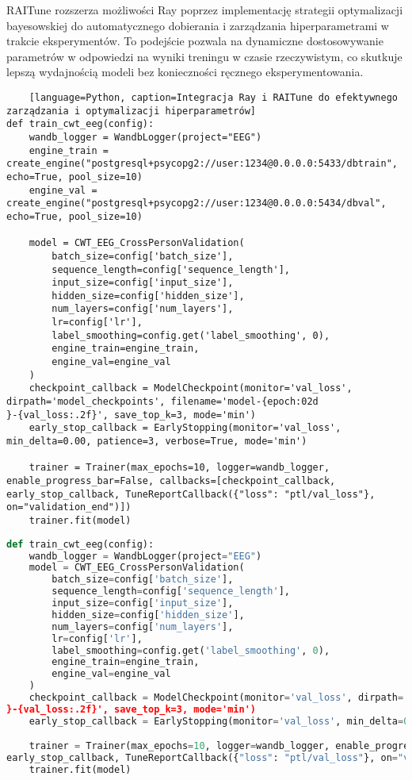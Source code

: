 \documentclass[12pt,twoside]{article}
\begin{document}
    RAITune rozszerza możliwości Ray poprzez implementację strategii optymalizacji bayesowskiej do automatycznego
    dobierania i zarządzania hiperparametrami w trakcie eksperymentów. To podejście pozwala na dynamiczne dostosowywanie
    parametrów w odpowiedzi na wyniki treningu w czasie rzeczywistym, co skutkuje lepszą wydajnością modeli bez
    konieczności ręcznego eksperymentowania.

    \begin{lstlisting}
    [language=Python, caption=Integracja Ray i RAITune do efektywnego zarządzania i optymalizacji hiperparametrów]
def train_cwt_eeg(config):
    wandb_logger = WandbLogger(project="EEG")
    engine_train = create_engine("postgresql+psycopg2://user:1234@0.0.0.0:5433/dbtrain", echo=True, pool_size=10)
    engine_val = create_engine("postgresql+psycopg2://user:1234@0.0.0.0:5434/dbval", echo=True, pool_size=10)

    model = CWT_EEG_CrossPersonValidation(
        batch_size=config['batch_size'],
        sequence_length=config['sequence_length'],
        input_size=config['input_size'],
        hidden_size=config['hidden_size'],
        num_layers=config['num_layers'],
        lr=config['lr'],
        label_smoothing=config.get('label_smoothing', 0),
        engine_train=engine_train,
        engine_val=engine_val
    )
    checkpoint_callback = ModelCheckpoint(monitor='val_loss', dirpath='model_checkpoints', filename='model-{epoch:02d
}-{val_loss:.2f}', save_top_k=3, mode='min')
    early_stop_callback = EarlyStopping(monitor='val_loss', min_delta=0.00, patience=3, verbose=True, mode='min')

    trainer = Trainer(max_epochs=10, logger=wandb_logger, enable_progress_bar=False, callbacks=[checkpoint_callback,
early_stop_callback, TuneReportCallback({"loss": "ptl/val_loss"}, on="validation_end")])
    trainer.fit(model)
    \end{lstlisting}


    \begin{lstlisting}[language=Python, caption=Integracja Ray i RAITune w treningu modelu CWT\_EEG]
def train_cwt_eeg(config):
    wandb_logger = WandbLogger(project="EEG")
    model = CWT_EEG_CrossPersonValidation(
        batch_size=config['batch_size'],
        sequence_length=config['sequence_length'],
        input_size=config['input_size'],
        hidden_size=config['hidden_size'],
        num_layers=config['num_layers'],
        lr=config['lr'],
        label_smoothing=config.get('label_smoothing', 0),
        engine_train=engine_train,
        engine_val=engine_val
    )
    checkpoint_callback = ModelCheckpoint(monitor='val_loss', dirpath='model_checkpoints', filename='model-{epoch:02d
}-{val_loss:.2f}', save_top_k=3, mode='min')
    early_stop_callback = EarlyStopping(monitor='val_loss', min_delta=0.00, patience=3, verbose=True, mode='min')

    trainer = Trainer(max_epochs=10, logger=wandb_logger, enable_progress_bar=False, callbacks=[checkpoint_callback,
early_stop_callback, TuneReportCallback({"loss": "ptl/val_loss"}, on="validation_end")])
    trainer.fit(model)
    \end{lstlisting}
\end{document}
